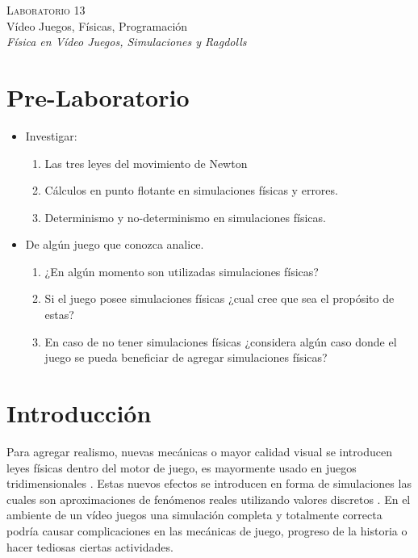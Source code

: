 \begin{center}
\textsc{\Large Laboratorio 13}~\\
{\large Vídeo Juegos, Físicas, Programación}~\\
\emph{Física en Vídeo Juegos, Simulaciones y Ragdolls}
\end{center}

\section{Pre-Laboratorio}
\begin{itemize}
\item Investigar:
\begin{enumerate}
  \item Las tres leyes del movimiento de Newton
  \item Cálculos en punto flotante en simulaciones físicas y errores.
  \item Determinismo y no-determinismo en simulaciones físicas.
\end{enumerate}
\item De algún juego que conozca analice.
\begin{enumerate}
  \item ¿En algún momento son utilizadas simulaciones físicas? 
  \item Si el juego posee simulaciones físicas ¿cual cree que sea el propósito de estas?
  \item En caso de no tener simulaciones físicas ¿considera algún caso donde el juego se pueda beneficiar de agregar simulaciones físicas?
\end{enumerate}
\end{itemize}

\section{Introducción}
Para agregar realismo, nuevas mecánicas o mayor calidad visual se introducen leyes físicas dentro del motor de juego, es mayormente usado en juegos tridimensionales \cite[p.~325]{jenkinscreatinggames}. Estas nuevos efectos se introducen en forma de simulaciones las cuales son aproximaciones de fenómenos reales utilizando valores discretos \cite{ian_gamephysics}. En el ambiente de un vídeo juegos una simulación completa y totalmente correcta podría causar complicaciones en las mecánicas de juego, progreso de la historia o hacer tediosas ciertas actividades.

